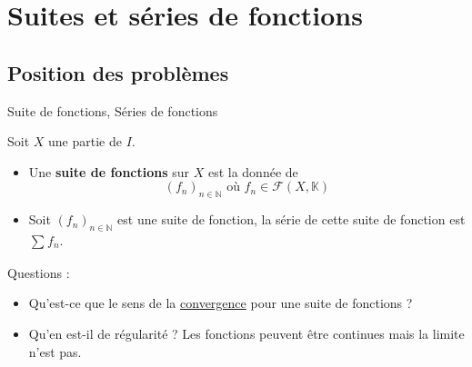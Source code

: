 \chapter{Suites et séries de fonctions} %
\label{chap:Suites et séries de fonctions}

\section{Position des problèmes} %
\label{sec:Position des problèmes}

\begin{Definition}[colbacktitle=red!75!black]{Suite de fonctions, Séries de fonctions}{}

  Soit $X$ une partie de $I$. 
  \begin{itemize}

      \item Une \textbf{suite de fonctions} sur $X$ est la donnée de 
        \begin{equation}
          (f_n) _{n \in \mathbb{N}} \text{ où } f_n \in \mathscr{F}(X, \mathbb{K})
        \end{equation}

      \item Soit $(f_n) _{n \in \mathbb{N}}$ est une suite de fonction, la série de cette suite de fonction est $\sum_{}^{}f_n$.
  \end{itemize}
\end{Definition}

\begin{tcolorbox}
    Questions : 
    \begin{itemize}

        \item Qu'est-ce que le sens de la \underline{convergence} pour une suite de fonctions ? 

        \item Qu'en est-il de régularité ? Les fonctions peuvent être continues mais la limite n'est pas.

    \end{itemize}
\end{tcolorbox}


